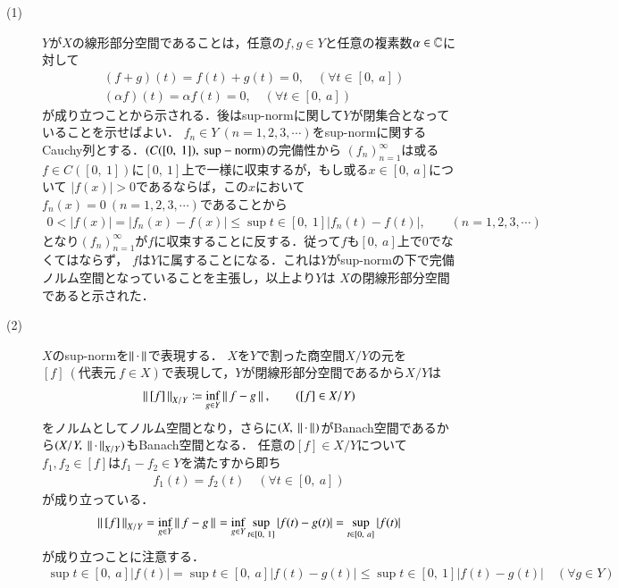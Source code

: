 \begin{prf}
\begin{description}\mbox{}
	\item[(1)]
		$Y$が$X$の線形部分空間であることは，任意の$f,g \in Y$と任意の複素数$\alpha \in \mathbb{C}$に対して
		\begin{align}
			&(f+g)(t) = f(t) + g(t) = 0, \quad (\forall t \in [0,\ a]) \\
			&(\alpha f) (t) = \alpha f(t) = 0, \quad (\forall t \in [0,\ a])
		\end{align}
		が成り立つことから示される．後はsup-normに関して$Y$が閉集合となっていることを示せばよい．
		$f_n \in Y\ (n=1,2,3,\cdots)$をsup-normに関するCauchy列とする．$(C([0,\ 1]),\ \rm{sup-norm})$の完備性から
		$(f_n)_{n=1}^{\infty}$は或る$f \in C([0,\ 1])$に$[0,\ 1]$上で一様に収束するが，もし或る$x \in [0,\ a]$について
		$|f(x)| > 0$であるならば，この$x$において$f_n(x)=0\ (n=1,2,3,\cdots)$であることから
		\begin{align}
			0 < |f(x)| = |f_n(x) - f(x)| \leq \sup{t \in [0,\ 1]}{|f_n(t) - f(t)|}, \qquad (n=1,2,3,\cdots)
		\end{align}
		となり$(f_n)_{n=1}^{\infty}$が$f$に収束することに反する．従って$f$も$[0,\ a]$上で0でなくてはならず，
		$f$は$Y$に属することになる．これは$Y$がsup-normの下で完備ノルム空間となっていることを主張し，以上より$Y$は
		$X$の閉線形部分空間であると示された．
	\item[(2)]
		$X$のsup-normを$\left\|\, \cdot\, \right\|_{}$で表現する．
		$X$を$Y$で割った商空間$X/Y$の元を$[f]\ (\mbox{代表元}\ f \in X)$で表現して，$Y$が閉線形部分空間であるから$X/Y$は
		\begin{align}
			\left\|\, [f]\, \right\|_{X/Y} \coloneqq \operatorname*{inf}_{g \in Y} \left\|\, f - g\, \right\|_{},\qquad ([f] \in X/Y)
		\end{align}
		をノルムとしてノルム空間となり，さらに$(X,\ \Norm{\cdot}{})$がBanach空間であるから$(X/Y,\ \Norm{\cdot}{X/Y})$もBanach空間となる．
		任意の$[f] \in X/Y$について$f_1, f_2 \in [f]$は$f_1 - f_2 \in Y$を満たすから即ち
		\begin{align}
			f_1(t) = f_2(t) \quad (\forall t \in [0,\ a])
		\end{align}
		が成り立っている．
		\begin{align}
			\left\|\, [f]\, \right\|_{X/Y} = \operatorname*{inf}_{g \in Y} \left\|\, f - g\, \right\|_{} = \operatorname*{inf}_{g \in Y} \operatorname*{sup}_{t \in [0,\ 1]} |f(t) - g(t)| = \operatorname*{sup}_{t \in [0,\ a]} |f(t)|
		\end{align}
		が成り立つことに注意する．
		\begin{align}
			\sup{t \in [0,\ a]}{|f(t)|} = \sup{t \in [0,\ a]}{|f(t) - g(t)|} \leq \sup{t \in [0,\ 1]}{|f(t) - g(t)|}\quad (\forall g \in Y)

\end{align}
\end{description}
\end{prf}

